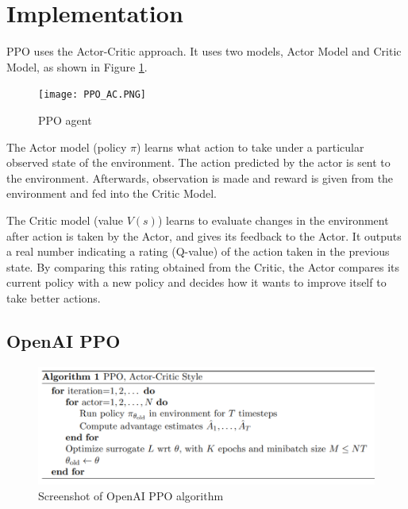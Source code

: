 \documentclass[lang=en,mode=normal,device=normal,color=blue,12pt]{elegantnote}
\DeclareMathOperator*{\1}{\mathbbm{1}}
\begin{document}






\section{Implementation}


PPO uses the Actor-Critic approach. It uses two models, Actor Model and Critic Model, as shown in Figure \ref{fig:ppo_ac}.

\begin{figure}[!ht]
  \centering
  \texttt{[image: PPO\_AC.PNG]}
  \caption{PPO agent}
  \label{fig:ppo_ac}
\end{figure}

The Actor model (policy $\pi$) learns what action to take under a particular observed state of the environment.
The action predicted by the actor is sent to the environment. Afterwards, observation is made and reward is given from the environment and fed into the Critic Model.

The Critic model (value $V(s)$) learns to evaluate changes in the environment after action is taken by the Actor, and gives its feedback to the Actor. It outputs a real number indicating a rating (Q-value) of the action taken in the previous state. By comparing this rating obtained from the Critic, the Actor compares its current policy with a new policy and decides how it wants to improve itself to take better actions.



\subsection{OpenAI PPO}

\begin{figure}[!h]
  \centering
  \includegraphics[width=0.7\linewidth]{ppo_openai.PNG}
  \caption{Screenshot of OpenAI PPO algorithm}
  \label{fig:ppo}
\end{figure}
\end{document}

